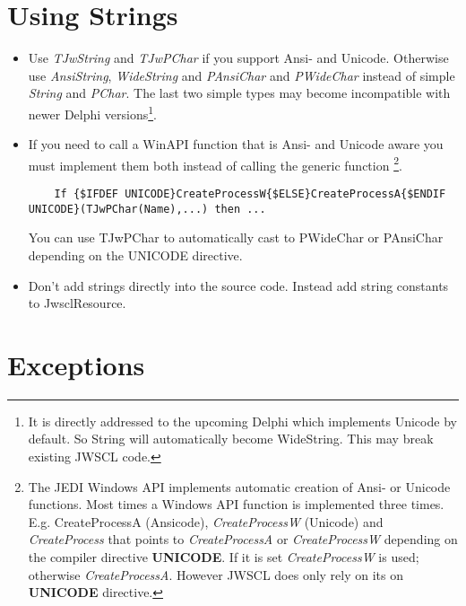 \documentclass[a4paper,twoside,10pt]{report}
\begin{document}
\section{Using Strings}
\begin{itemize}
	\item Use \textit{TJwString} and \textit{TJwPChar} if you support Ansi- and Unicode. Otherwise use \textit{AnsiString}, \textit{WideString} and \textit{PAnsiChar} and \textit{PWideChar} instead of simple \textit{String} and \textit{PChar}. The last two simple types may become incompatible with newer Delphi versions\footnote{It is directly addressed to the upcoming Delphi which implements Unicode by default. So String will automatically become WideString. This may break existing JWSCL code.}.
	\item If you need to call a WinAPI function that is Ansi- and Unicode aware you must implement them both instead of calling the generic function \footnote{The JEDI Windows API implements automatic creation of Ansi- or Unicode functions. Most times a Windows API function is implemented three times. E.g. CreateProcessA (Ansicode), \textit{CreateProcessW} (Unicode) and \textit{CreateProcess} that points to \textit{CreateProcessA} or \textit{CreateProcessW} depending on the compiler directive \textbf{UNICODE}. If it is set \textit{CreateProcessW} is used; otherwise \textit{CreateProcessA}. However JWSCL does only rely on its on \textbf{UNICODE} directive.}.  
  \begin{lstlisting}
    If {$IFDEF UNICODE}CreateProcessW{$ELSE}CreateProcessA{$ENDIF UNICODE}(TJwPChar(Name),...) then ...
  \end{lstlisting} 
  You can use TJwPChar to automatically cast to PWideChar or PAnsiChar depending on the UNICODE directive.
	\item Don't add strings directly into the source code. Instead add string constants to JwsclResource. 	
\end{itemize}

\section{Exceptions}
\end{document}
